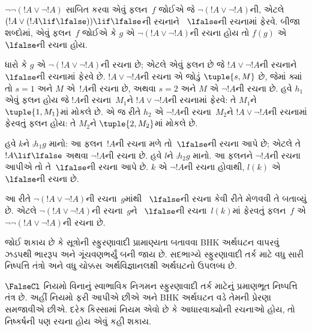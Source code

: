 \begin{ex}
$\lnot \lnot (!A \lor \lnot !A)$ સાબિત કરવા એવું ફલન~$f$
જોઈએ જે $\lnot(!A \lor \lnot !A)$ની, એટલે
$(!A \lor (!A \lif \lfalse)) \lif \lfalse$ની રચનાને
~$\lfalse$ની રચનામાં ફેરવે. બીજા શબ્દોમાં, એવું ફલન~$f$
જોઈએ કે $g$ એ $\lnot(!A \lor \lnot !A)$ની રચના હોય તો
$f(g)$ એ~$\lfalse$ની રચના હોય.

ધારો કે $g$ એ $\lnot(!A \lor \lnot !A)$ની રચના છે; એટલે
એવું ફલન છે જે $!A \lor \lnot !A$ની રચનાને~$\lfalse$ની
રચનામાં ફેરવે છે. $!A \lor \lnot !A$ની રચના એ જોડું
$\tuple{s, M}$ છે, જેમાં ક્યાં તો $s = 1$ અને $M$
એ~$!A$ની રચના છે, અથવા $s = 2$ અને $M$ એ $\lnot !A$ની
રચના છે. હવે $h_1$ એવું ફલન હોય જે $!A$ની રચના~$M_1$ને
$!A \lor \lnot !A$ની રચનામાં ફેરવે: તે $M_1$ને
$\tuple{1, M_1}$માં મોકલે છે.
એ જ રીતે $h_2$ એ $\lnot !A$ની રચના~$M_2$ને
$!A \lor \lnot !A$ની રચનામાં ફેરવતું ફલન હોય: તે
$M_2$ને $\tuple{2, M_2}$માં મોકલે છે.

હવે $k$ને $\comp{h_1}{g}$ માનો: આ ફલન~$!A$ની રચના
મળે તો~$\lfalse$ની રચના આપે છે; એટલે તે $!A \lif \lfalse$
અથવા $\lnot !A$ની રચના છે. હવે $l$ને $\comp{h_2}{g}$
માનો. આ ફલનને $\lnot !A$ની રચના આપીએ તો તે~$\lfalse$ની
રચના આપે છે. $k$ એ $\lnot !A$ની રચના હોવાથી, $l(k)$
એ~$\lfalse$ની રચના છે.

આ રીતે $\lnot(!A \lor \lnot !A)$ની રચના~$g$માંથી
~$\lfalse$ની રચના કેવી રીતે મેળવવી તે બતાવ્યું છે.
એટલે $\lnot(!A \lor \lnot !A)$ની રચના~$g$ને
~$\lfalse$ની રચના~$l(k)$માં ફેરવતું ફલન~$f$ એ
$\lnot\lnot(!A \lor \lnot !A)$ની રચના છે.
\end{ex}

જોઈ શકાય છે કે સૂત્રોની સ્ફુરણાવાદી પ્રામાણ્યતા
બતાવવા BHK અર્થઘટન વાપરવું ઝડપથી ભારરૂપ અને ગૂંચવણભર્યું
બની જાય છે. સદભાગ્યે સ્ફુરણાવાદી તર્ક માટે વધુ સારી
નિષ્પત્તિ તંત્રો અને વધુ ચોક્કસ અર્થવિજ્ઞાનલક્ષી
અર્થઘટનો ઉપલબ્ધ છે.
\endgroup


\begingroup
\makeatletter{}\makeatother


\label{guunit:OLP-0496}


$\FalseCl$ નિયમો વિનાનું સ્વાભાવિક નિગમન સ્ફુરણાવાદી તર્ક
માટેનું પ્રમાણભૂત નિષ્પત્તિ તંત્ર છે. અહીં નિયમો ફરી
આપીએ છીએ અને BHK અર્થઘટન વડે તેમની પ્રેરણા સમજાવીએ છીએ.
દરેક કિસ્સામાં નિયમ એવો છે કે આધારવાક્યોની રચનાઓ હોય, તો
નિષ્કર્ષની પણ રચના હોય એવું કહી શકાય.

